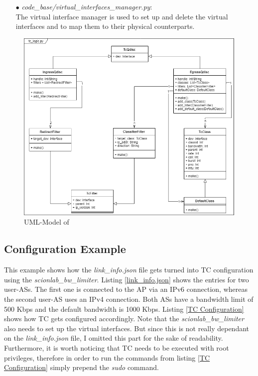 \begin{enumerate}
\item[$\bullet$]\textit{code\_base/virtual\_interfaces\_manager.py}:
\\
The virtual interface manager is used to set up and delete the virtual interfaces and to map them to their physical counterparts.

\end{enumerate}

\begin{figure}[h]
	\centering
  	\includegraphics[width=\textwidth]{img/tc_logic_uml.png}
    \caption{UML-Model of }
    \label{tc logic uml}
\end{figure}

\newpage
\textit{ }
\newpage
\subsection{Configuration Example}

This example shows how the \textit{link\_info.json} file gets turned into \acs{TC} configuration using the \textit{scionlab\_bw\_limiter}. Listing \ref{link_info.json} shows the entries for two user-\acsp{AS}.  The first one is connected to the \acs{AP} via an \acs{IP}v6 connection, whereas the second user-\acs{AS} uses an \acs{IP}v4 connection. Both \acsp{AS} have a bandwidth limit of 500 Kbps and the default bandwidth is 1000 Kbps. Listing \ref{TC Configuration} shows how \acs{TC} gets configured accordingly. Note that the \textit{scionlab\_bw\_limiter} also needs to set up the virtual interfaces. But since this is not really dependant on the \textit{link\_info.json} file, I omitted this part for the sake of readability. Furthermore, it is worth noticing that \acs{TC} needs to be executed with root privileges, therefore in order to run the commands from listing \ref{TC Configuration} simply prepend the \textit{sudo} command.

